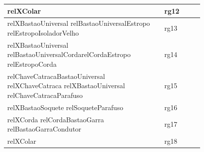 \documentclass[12pt]{article}
\begin{document}
\begin{table}[H]
\begin{tabular}{|p{0.8\linewidth}|l|}
relXColar                                                                                                                                                                                                                                                                                                                                 & rg12        \\ \hline
relXBastaoUniversal relBastaoUniversalEstropo relEstropoIsoladorVelho                                                                                                                                                                                                                                                                     & rg13        \\ \hline
relXBastaoUniversal relBastaoUniversalCordarelCordaEstropo relEstropoCorda                                                                                                                                                                                                                                                                & rg14        \\ \hline
relChaveCatracaBastaoUniversal relXChaveCatraca relXBastaoUniversal relChaveCatracaParafuso                                                                                                                                                                                                                                               & rg15        \\ \hline
relXBastaoSoquete relSoqueteParafuso                                                                                                                                                                                                                                                                                                      & rg16        \\ \hline
relXCorda relCordaBastaoGarra relBastaoGarraCondutor                                                                                                                                                                                                                                                                                      & rg17        \\ \hline
relXColar                                                                                                                                                                                                                                                                                                                                 & rg18        \\ \hline

\end{tabular}
\end{table}
\end{document}
